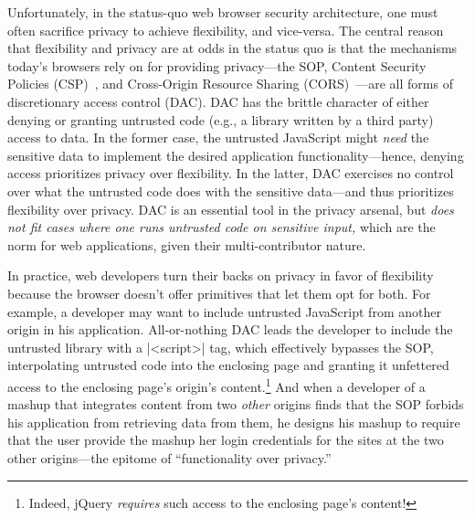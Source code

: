 Unfortunately, in the status-quo web browser security architecture,
one must often sacrifice privacy to achieve flexibility, and
vice-versa. The central reason that flexibility and privacy are at
odds in the status quo is that the mechanisms today's browsers rely on
for providing privacy---the SOP, Content Security Policies
(CSP)~\cite{csp}, and Cross-Origin Resource Sharing
(CORS)~\cite{cors13}---are all forms of discretionary access control
(DAC). DAC has the brittle character of either denying or granting
untrusted code (e.g., a library written by a third party) access to
data. In the former case, the untrusted JavaScript might {\em need}
the sensitive data to implement the desired application
functionality---hence, denying access prioritizes privacy over
flexibility. In the latter, DAC exercises no control over what the
untrusted code does with the sensitive data---and thus prioritizes
flexibility over privacy. DAC is an essential tool in the privacy
arsenal, but {\em does not fit cases where one runs untrusted code on
  sensitive input,} which are the norm for web applications, given
their multi-contributor nature.

In practice, web developers turn their backs on privacy in favor of
flexibility because the browser doesn't offer primitives that let them
opt for both. For example, a developer may want to include untrusted
JavaScript from another origin in his application. All-or-nothing DAC
leads the developer to include the untrusted library with a
\js|<script>| tag, which effectively bypasses the SOP, interpolating
untrusted code into the enclosing page and granting it unfettered
access to the enclosing page's origin's content.\footnote{Indeed,
  jQuery \emph{requires} such access to the enclosing page's content!}
And when a developer of a mashup that integrates content from two {\em
  other} origins finds that the SOP forbids his application from
retrieving data from them, he designs his mashup to require that the
user provide the mashup her login credentials for the sites at the two
other origins---the epitome of ``functionality over privacy.''

%

